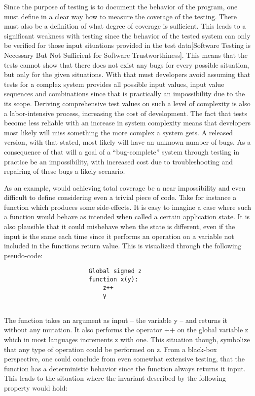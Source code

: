 \documentclass{article}
\begin{document}
Since the purpose of testing is to document the behavior of the program, one must define in a clear way how to measure the coverage of the testing. There must also be a definition of what degree of coverage is sufficient. This leads to a significant weakness with testing since the behavior of the tested system can only be verified for those input situations provided in the test data[Software Testing is Necessary But Not Sufficient for Software Trustworthiness]. This means that the tests cannot show that there does not exist any bugs for every possible situation, but only for the given situations. With that must developers avoid assuming that tests for a complex system provides all possible input values, input value sequences and combinations since that is practically an impossibility due to the its scope. Deriving comprehensive test values on such a level of complexity is also a labor-intensive process, increasing the cost of development. The fact that tests become less reliable with an increase in system complexity means that developers most likely will miss something the more complex a system gets. A released version, with that stated, most likely will have an unknown number of bugs. As a consequence of that will a goal of a “bug-complete” system through testing in practice be an impossibility,  with increased cost due to troubleshooting and repairing of these bugs a likely scenario.  

As an example, would achieving total coverage be a near impossibility and even difficult to define considering even a trivial piece of code. Take for instance a function which produces some side-effects. It is easy to imagine a case where such a function would behave as intended when called a certain application state. It is also plausible that it could misbehave when the state is different, even if the input is the same each time since it performs an operation on a variable not included in the functions return value. This is visualized through the following pseudo-code:

\begin{verbatim}
                        Global signed z
                        function x(y):
                            z++           
                            y
                            
\end{verbatim}
The function takes an argument as input – the variable y – and returns it without any mutation. It also performs the operator ++ on the global variable z which in most languages increments z with one. This situation though, symbolize that any type of operation could be performed on z. From a black-box perspective, one could conclude from even somewhat extensive testing, that the function has a deterministic behavior since the function always returns it input. This leads to the situation where the invariant described by the following property would hold:
\end{document}
